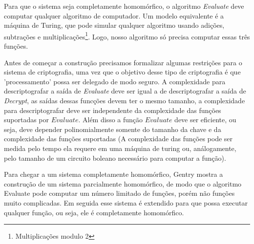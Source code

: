 Para que o sistema seja completamente homomórfico, o algoritmo \textit{Evaluate} deve computar qualquer algoritmo de computador. Um modelo equivalente é a máquina de Turing, que pode simular qualquer algoritmo usando adições, subtrações e multiplicações\footnote{Multiplicações modulo 2}. Logo, nosso algoritmo só precisa computar essas três funções.

Antes de começar a construção precisamos formalizar algumas restrições para o sistema de criptografia, uma vez que o objetivo desse tipo de criptografia é que 'processamento' possa ser delegado de modo seguro. A complexidade para descriptografar a saída de \textit{Evaluate} deve ser igual a de descriptografar a saída de \textit{Decrypt}, as saídas dessas funcções devem ter o mesmo tamanho, a complexidade para descriptografar deve ser independente da complexidade das funções suportadas por \(Evaluate\). Além disso a função \(Evaluate\) deve ser eficiente, ou seja, deve depender polinomialmente somente do tamanho da chave e da complexidade das funções suportadas (A complexidade das funções pode ser medida pelo tempo ela requere em uma máquina de turing ou, análogamente, pelo tamanho de um circuito boleano necessário para computar a função).

Para chegar a um sistema completamente homomórfico, Gentry mostra a construção de um sistema parcialmente homomórfico, de modo que o algoritmo Evaluate pode computar um número limitado de funções, porém não funções muito complicadas. Em seguida esse sistema é extendido para que possa executar qualquer função, ou seja, ele é completamente homomórfico.

